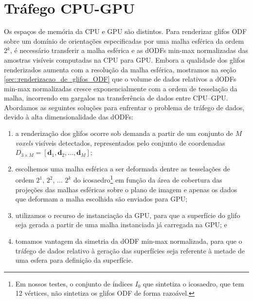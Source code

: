 
\section{Tráfego CPU-GPU}
\label{sec::trafego_cpu_gpu}

Os espaços de memória da CPU e GPU são distintos. Para renderizar glifos ODF sobre um domínio de orientações especificadas por uma malha esférica da ordem 2$^k$, é necessário transferir a malha esférica e as dODFs min-max normalizadas das amostras visíveis computadas na CPU para GPU. Embora a qualidade dos glifos renderizados aumenta com a resolução da malha esférica, mostramos na seção \ref{sec::renderizacao_de_glifos_ODF} que o volume de dados relativos a dODFs min-max normalizadas cresce exponencialmente com a ordem de tesselação da malha, incorrendo em gargalos na transferência de dados entre CPU--GPU. Abordamos as seguintes soluções para enfrentar o problema de tráfego de dados, devido à alta dimensionalidade das dODFs:

\begin{enumerate}
    \item a renderização dos glifos ocorre sob demanda a partir de um conjunto de $M$ \textit{voxels} visíveis detectados, representados pelo conjunto de coordenadas $D_{3 \times M} = [
\mathbf{d}_1,
\mathbf{d}_2, ..., 
\mathbf{d}_M
]$;
\item escolhemos uma malha esférica a ser deformada dentre as tesselações de ordem $2^1$, $2^2$, ... $2^k$ do icosaedro\footnote{Em nossos testes, o conjunto de índices $I_0$ que sintetiza o icosaedro, que tem 12 vértices, não sintetiza os glifos ODF de forma razoável.} em função da área de cobertura das projeções das malhas esféricas sobre o plano de imagem e apenas os dados que deformam a malha escolhida são enviados para GPU;
\item utilizamos o recurso de instanciação da GPU, para que a superfície do glifo seja gerada a partir de uma malha instanciada já carregada na GPU; e
\item tomamos vantagem da simetria da dODF min-max normalizada, para que o tráfego de dados relativo à geração das superfícies seja referente à metade de uma esfera para definição da superfície.
\end{enumerate}





